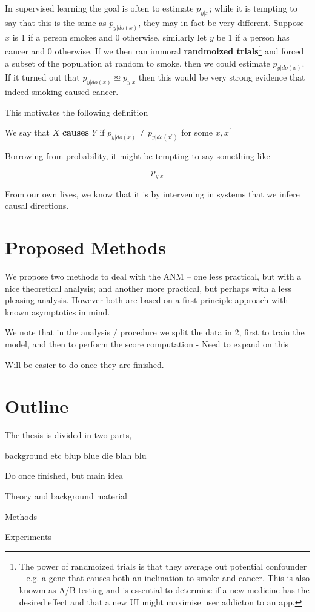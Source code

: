In supervised learning the goal is often to estimate $p_{y|x}$; while it is tempting to say that this is the 
same as $p_{y|do(x)}$, they may in fact be very different. Suppose $x$ is 1 if a person smokes and 0 otherwise, 
similarly let $y$ be 1 if a person has cancer and 0 otherwise. If we then ran immoral 
\textbf{randmoized trials}\footnote{The power of randmoized trials is that they average out potential confounder 
-- e.g. a gene that causes both an inclination to smoke and cancer. This is also knowm as A/B testing and is 
essential to determine if a new medicine has the desired effect and that a new UI might maximise user addicton 
to an app.} and forced a subset of the population at random to smoke, then we could estimate $p_{y|do(x)}$. 
If it turned out that $p_{y|do(x)} \approxeq p_{y|x}$ then this would be very strong evidence that indeed 
smoking caused cancer.

This motivates the following definition

\begin{definition}
    We say that $X$ \textbf{causes} $Y$ if $p_{y|do(x)} \neq p_{y|do(x^\prime)}$ for some
    $x, x^\prime$
\end{definition}


Borrowing from probability, it might be tempting to say something like 

$$
    p_{y|x}
$$

From our own lives, we know that it is by intervening in systems that we infere causal directions. 


\section{Proposed Methods}

We propose two methods to deal with the ANM -- one less practical, but with a nice theoretical
analysis; and another more practical, but perhaps with a less pleasing analysis. However both
are based on a first principle approach with known asymptotics in mind.

We note that in the analysis / procedure we split the data in 2, first to train the model, and
then to perform the score computation - Need to expand on this

Will be easier to do once they are finished.


\section{Outline}

The thesis is divided in two parts, 

background etc blup blue die blah blu

Do once finished, but main idea

Theory and background material

Methods

Experiments